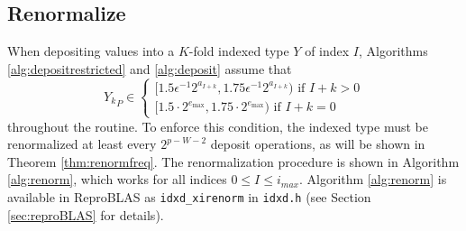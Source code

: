 \subsection{Renormalize}
    \label{sec:primitiveops_renormalize}
    When depositing values into a $K$-fold indexed type $Y$ of index $I$,
    Algorithms \ref{alg:depositrestricted} and \ref{alg:deposit}
    assume that 
    \[
      {Y_k}_P \in \begin{cases}[1.5  \epsilon^{-1} 2^{a_{I + k}}, 1.75  \epsilon^{-1} 2^{a_{I + k}}) \text{ if } I + k > 0 \\ [1.5 \cdot 2^{e_{\max}}, 1.75 \cdot 2^{e_{\max}}) \text{ if } I + k = 0\end{cases}
    \] 
    throughout the routine.
    To enforce this condition, the indexed type must be renormalized at least
    every $2^{p-W-2}$ deposit operations, as will be shown in Theorem \ref{thm:renormfreq}.
    The renormalization procedure is shown in Algorithm \ref{alg:renorm},
    which works for all indices $0 \leq I \leq i_{max}$. Algorithm \ref{alg:renorm} is available in ReproBLAS as \texttt{idxd\_xirenorm} in \texttt{idxd.h} (see Section \ref{sec:reproBLAS} for details).

